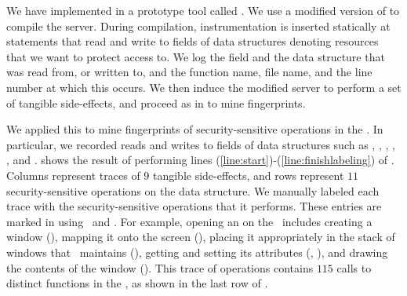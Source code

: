 \begin{table}[ht!]

{\label{table:aid-experiments}}
\end{table}

We have implemented  in a prototype
tool called \aid. We use a modified version of  to compile the
server. During compilation, instrumentation is inserted statically at statements 
that read and write to fields of data structures denoting resources that we
want to protect access to. We log the field and the data structure that was 
read from, or written to, and the function name, file name, and the line number 
at which this occurs. We then induce the modified server to perform a set of 
tangible side-effects, and proceed as in  
to mine fingerprints.

We applied this to mine fingerprints of security-sensitive operations in the
\xserver. In particular, we recorded reads and writes to fields of data
structures such as , , , ,
, and .   shows the
result of performing lines (\ref{line:start})-(\ref{line:finishlabeling}) of
.  Columns represent traces of $9$
tangible side-effects, and rows represent $11$ security-sensitive operations on
the  data structure. We manually labeled each trace with the
security-sensitive operations that it performs. These entries are marked in
 using \y\ and \mn. For example, opening an
 on the \xserver\ includes creating a window (),
mapping it onto the screen (), placing it appropriately in the
stack of windows that \xserver\ maintains (), getting and
setting its attributes (, ), and
drawing the contents of the window ().  This trace of
operations contains $115$ calls to distinct functions in the \xserver, as shown
in the last row of .

